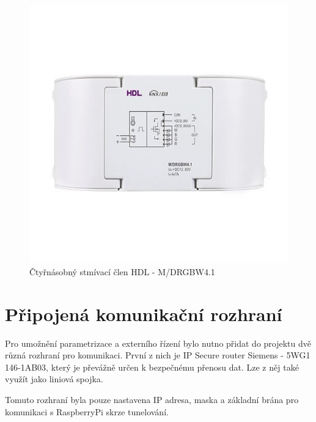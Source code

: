 \begin{figure}[!ht]
  \begin{center}
    \includegraphics[scale=0.4]{obrazky/HLD aktor2.jpg}
  \end{center}
  \caption[Čtyřnásobný stmívací člen HDL - M/DRGBW4.1 \cite{HDL aktor2}]{Čtyřnásobný stmívací člen HDL - M/DRGBW4.1 \cite{HDL aktor2}}
  \label{fig:Čtyřnásobný stmívací člen HDL - M/DRGBW4.1}
\end{figure}

\section{Připojená komunikační rozhraní}
Pro umožnění parametrizace a externího řízení bylo nutno přidat do projektu dvě různá rozhraní pro komunikaci. První z nich je IP Secure router Siemens - 5WG1 146-1AB03, který je převážně určen k bezpečnému přenosu dat. Lze z něj také využít jako liniová spojka. \cite{Siemens IP}

Tomuto rozhraní byla pouze nastavena IP adresa, maska a základní brána pro komunikaci s RaspberryPi skrze tunelování.

